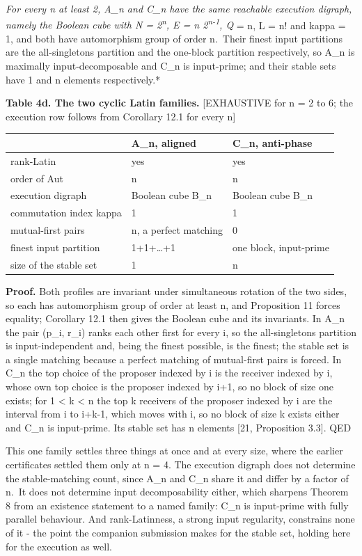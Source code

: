 \documentclass[
  11pt,
]{article}
\begin{document}
\emph{For every n at least 2, A\_n and C\_n have the same reachable
execution digraph, namely the Boolean cube with N =
2\textsuperscript{n}, E = n 2\textsuperscript{n-1}, Q} = n, L = n! and
kappa = 1, and both have automorphism group of order n.~Their finest
input partitions are the all-singletons partition and the one-block
partition respectively, so A\_n is maximally input-decomposable and C\_n
is input-prime; and their stable sets have 1 and n elements
respectively.*

\textbf{Table 4d. The two cyclic Latin families.} {[}EXHAUSTIVE for n =
2 to 6; the execution row follows from Corollary 12.1 for every n{]}

\begin{longtable}[]{@{}lll@{}}
\toprule\noalign{}
& A\_n, aligned & C\_n, anti-phase \\
\midrule\noalign{}
\endhead
\bottomrule\noalign{}
\endlastfoot
rank-Latin & yes & yes \\
order of Aut & n & n \\
execution digraph & Boolean cube B\_n & Boolean cube B\_n \\
commutation index kappa & 1 & 1 \\
mutual-first pairs & n, a perfect matching & 0 \\
finest input partition & 1+1+\ldots+1 & one block, input-prime \\
size of the stable set & 1 & n \\
\end{longtable}

\textbf{Proof.} Both profiles are invariant under simultaneous rotation
of the two sides, so each has automorphism group of order at least n,
and Proposition 11 forces equality; Corollary 12.1 then gives the
Boolean cube and its invariants. In A\_n the pair (p\_i, r\_i) ranks
each other first for every i, so the all-singletons partition is
input-independent and, being the finest possible, is the finest; the
stable set is a single matching because a perfect matching of
mutual-first pairs is forced. In C\_n the top choice of the proposer
indexed by i is the receiver indexed by i, whose own top choice is the
proposer indexed by i+1, so no block of size one exists; for 1
\textless{} k \textless{} n the top k receivers of the proposer indexed
by i are the interval from i to i+k-1, which moves with i, so no block
of size k exists either and C\_n is input-prime. Its stable set has n
elements {[}21, Proposition 3.3{]}. QED

This one family settles three things at once and at every size, where
the earlier certificates settled them only at n = 4. The execution
digraph does not determine the stable-matching count, since A\_n and
C\_n share it and differ by a factor of n.~It does not determine input
decomposability either, which sharpens Theorem 8 from an existence
statement to a named family: C\_n is input-prime with fully parallel
behaviour. And rank-Latinness, a strong input regularity, constrains
none of it - the point the companion submission makes for the stable
set, holding here for the execution as well.
\end{document}
